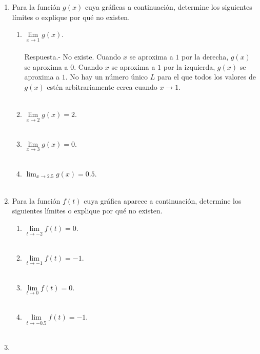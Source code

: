 \begin{enumerate}

\item Para la función $g(x)$ cuya gráficas a continuación, determine los siguientes límites o explique por qué no existen.
\begin{enumerate}[\bfseries a)]

    \item $\lim\limits_{x\to 1} g(x)$.\\\\
    Respuesta.-\; No existe. Cuando $x$ se aproxima a $1$ por la derecha, $g(x)$ se aproxima a $0$. Cuando $x$ se aproxima a $1$ por la izquierda, $g(x)$ se aproxima a $1$. No hay un número único $L$ para el que todos los valores de $g(x)$ estén arbitrariamente cerca cuando ${x \to 1}$.\\\\

    \item $\lim\limits_{x\to 2} g(x) = 2$.\\\\

    \item $\lim\limits_{x\to 3} g(x) = 0$.\\\\

    \item $\lim_{x\to 2.5} g(x) = 0.5$.\\\\

\end{enumerate}

\item Para la función $f(t)$ cuya gráfica aparece a continuación, determine los siguientes límites o explique por qué no existen.
\begin{enumerate}[\bfseries a)]
    
    \item $\lim\limits_{t\to -2} f(t) = 0$.\\\\

    \item $\lim\limits_{t\to -1} f(t) = -1$.\\\\

    \item $\lim\limits_{t\to 0} f(t) = 0$.\\\\

    \item $\lim\limits_{t\to -0.5} f(t) = -1$.\\\\

\end{enumerate}

\item 

\end{enumerate}
